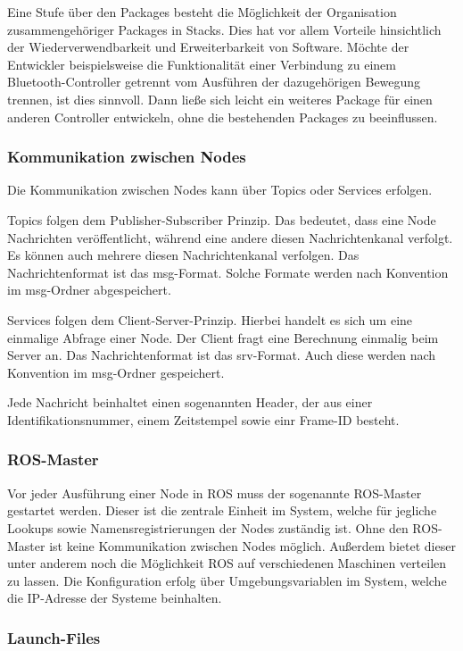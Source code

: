 Eine Stufe über den Packages besteht die Möglichkeit der Organisation zusammengehöriger Packages in Stacks. Dies hat vor allem Vorteile hinsichtlich der Wiederverwendbarkeit und Erweiterbarkeit von Software. Möchte der Entwickler beispielsweise die Funktionalität einer Verbindung zu einem Bluetooth-Controller getrennt vom Ausführen der dazugehörigen Bewegung trennen, ist dies sinnvoll. Dann ließe sich leicht ein weiteres Package für einen anderen Controller entwickeln, ohne die bestehenden Packages zu beeinflussen.

\subsubsection{Kommunikation zwischen Nodes}

Die Kommunikation zwischen Nodes kann über Topics oder Services erfolgen.

Topics folgen dem Publisher-Subscriber Prinzip. Das bedeutet, dass eine Node Nachrichten veröffentlicht, während eine andere diesen Nachrichtenkanal verfolgt. Es können auch mehrere diesen Nachrichtenkanal verfolgen. Das Nachrichtenformat ist das msg-Format. Solche Formate werden nach Konvention im msg-Ordner abgespeichert.

Services folgen dem Client-Server-Prinzip. Hierbei handelt es sich um eine einmalige Abfrage einer Node. Der Client fragt eine Berechnung einmalig beim Server an.  Das Nachrichtenformat ist das srv-Format. Auch diese werden nach Konvention im msg-Ordner gespeichert.
    
Jede Nachricht beinhaltet einen sogenannten Header, der aus einer Identifikationsnummer, einem Zeitstempel sowie einr Frame-ID besteht.

\subsubsection{ROS-Master}

Vor jeder Ausführung einer Node in \ac{ROS} muss der sogenannte \ac{ROS}-Master gestartet werden. Dieser ist die zentrale Einheit im System, welche für jegliche Lookups sowie Namensregistrierungen der Nodes zuständig ist. Ohne den \ac{ROS}-Master ist keine Kommunikation zwischen Nodes möglich. Außerdem bietet dieser unter anderem noch die Möglichkeit \ac{ROS} auf verschiedenen Maschinen verteilen zu lassen. Die Konfiguration erfolg über Umgebungsvariablen im System, welche die IP-Adresse der Systeme beinhalten.

\subsubsection{Launch-Files}


